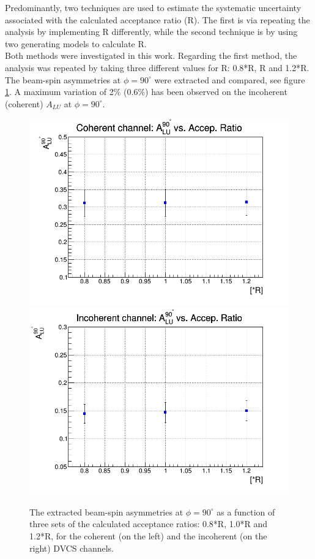 Predominantly, two techniques are used to estimate the systematic uncertainty associated with the calculated acceptance ratio (R). The first is via repeating the analysis by implementing R differently, while the second technique is by using two generating models to calculate R.\\

Both methods were investigated in this work. Regarding the first method, the analysis was repeated by taking three different values for R: 0.8*R, R and 1.2*R. The beam-spin asymmetries at $\phi = 90^{\circ}$ were extracted and compared, see figure \ref{fig:background_sub_sys_uncer}. A maximum variation of 2$\%$ (0.6$\%$) has been observed on the incoherent (coherent) $A_{LU}$ at $\phi = 90^{\circ}$. \\

\begin{figure}[tp]
\includegraphics[scale=0.30]{fig_dvcs/final_coh_BSA_NR.png}
\includegraphics[scale=0.30]{fig_dvcs/final_incoh_BSA_NR.png}
\caption{The extracted beam-spin asymmetries at $\phi = 90^{\circ}$ as a 
function of three sets of the calculated acceptance ratios: 0.8*R, 1.0*R and 
1.2*R, for the coherent (on the left) and the incoherent (on the right) DVCS 
channels.} \label{fig:background_sub_sys_uncer}
\end{figure}

